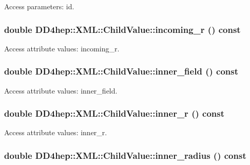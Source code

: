 Access parameters: id. \hypertarget{struct_d_d4hep_1_1_x_m_l_1_1_child_value_a86f942b8a522d942985f5b844fa67157}{
\subsubsection[{incoming\_\-r}]{\setlength{\rightskip}{0pt plus 5cm}double DD4hep::XML::ChildValue::incoming\_\-r () const}}
\label{struct_d_d4hep_1_1_x_m_l_1_1_child_value_a86f942b8a522d942985f5b844fa67157}


Access attribute values: incoming\_\-r. \hypertarget{struct_d_d4hep_1_1_x_m_l_1_1_child_value_a336f68ec8fa31f99878750ac462517b4}{
\subsubsection[{inner\_\-field}]{\setlength{\rightskip}{0pt plus 5cm}double DD4hep::XML::ChildValue::inner\_\-field () const}}
\label{struct_d_d4hep_1_1_x_m_l_1_1_child_value_a336f68ec8fa31f99878750ac462517b4}


Access attribute values: inner\_\-field. \hypertarget{struct_d_d4hep_1_1_x_m_l_1_1_child_value_a5f8d680cfaaba03683991a731fc0d4bf}{
\subsubsection[{inner\_\-r}]{\setlength{\rightskip}{0pt plus 5cm}double DD4hep::XML::ChildValue::inner\_\-r () const}}
\label{struct_d_d4hep_1_1_x_m_l_1_1_child_value_a5f8d680cfaaba03683991a731fc0d4bf}


Access attribute values: inner\_\-r. \hypertarget{struct_d_d4hep_1_1_x_m_l_1_1_child_value_a50cebda86a6d28ef20fbcb1791acc82e}{
\subsubsection[{inner\_\-radius}]{\setlength{\rightskip}{0pt plus 5cm}double DD4hep::XML::ChildValue::inner\_\-radius () const}}
\label{struct_d_d4hep_1_1_x_m_l_1_1_child_value_a50cebda86a6d28ef20fbcb1791acc82e}


